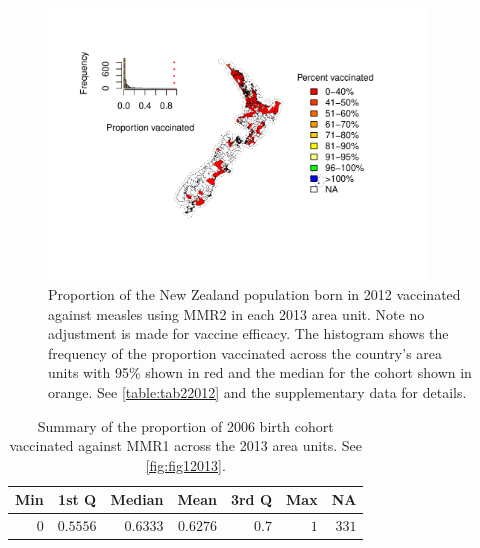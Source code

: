 \documentclass{article}
\begin{document}
\begin{figure}
\begin{center}
    \includegraphics[width=0.9\textwidth]{nir_census_MMR2_NIR_2012.pdf}
 \end{center}
    \caption{Proportion of the New Zealand population born in 2012 vaccinated against measles using MMR2 in each 2013 area unit. Note no adjustment is made for vaccine efficacy. The histogram shows the frequency of the proportion vaccinated across the country's area units with 95\% shown in red and the median for the cohort shown in orange. See \autoref{table:tab22012} and the supplementary data for details.}
\label{fig:fig22012}
\end{figure}

 \vspace{5mm} %
\begin{table}
\begin{center}
\begin{tabular}{rrrrrrr}
\hline\hline
\multicolumn{1}{c}{Min}&\multicolumn{1}{c}{1st Q}&\multicolumn{1}{c}{Median}&\multicolumn{1}{c}{Mean}&\multicolumn{1}{c}{3rd Q}&\multicolumn{1}{c}{Max}&\multicolumn{1}{c}{NA}\tabularnewline
\hline
$0$&$0.5556$&$0.6333$&$0.6276$&$0.7$&$1$&$331$\tabularnewline
\hline
\end{tabular}\end{center}\caption{Summary of the proportion of 2006 birth cohort vaccinated against MMR1 across the 2013 area units. See \autoref{fig:fig12013}.}
\label{table:tab12013}
\end{table}
\end{document}

